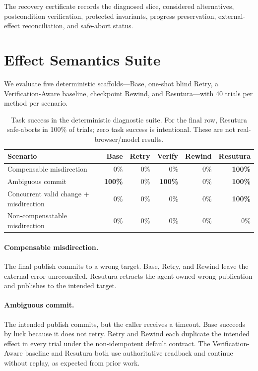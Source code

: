 \documentclass[10pt]{article}
\begin{document}
The recovery certificate records the diagnosed slice, considered alternatives, postcondition verification, protected invariants, progress preservation, external-effect reconciliation, and safe-abort status.

\section{Effect Semantics Suite}
We evaluate five deterministic scaffolds---Base, one-shot blind Retry, a Verification-Aware baseline, checkpoint Rewind, and Resutura---with 40 trials per method per scenario.

\begin{table}[h]
\centering
\small
\begin{tabular}{lrrrrr}
\toprule
Scenario & Base & Retry & Verify & Rewind & Resutura \\
\midrule
Compensable misdirection & 0\% & 0\% & 0\% & 0\% & \textbf{100\%} \\
Ambiguous commit & \textbf{100\%} & 0\% & \textbf{100\%} & 0\% & \textbf{100\%} \\
Concurrent valid change + misdirection & 0\% & 0\% & 0\% & 0\% & \textbf{100\%} \\
Non-compensatable misdirection & 0\% & 0\% & 0\% & 0\% & 0\% \\
\bottomrule
\end{tabular}
\caption{Task success in the deterministic diagnostic suite. For the final row, Resutura safe-aborts in 100\% of trials; zero task success is intentional. These are not real-browser/model results.}
\end{table}

\paragraph{Compensable misdirection.} The final publish commits to a wrong target. Base, Retry, and Rewind leave the external error unreconciled. Resutura retracts the agent-owned wrong publication and publishes to the intended target.

\paragraph{Ambiguous commit.} The intended publish commits, but the caller receives a timeout. Base succeeds by luck because it does not retry. Retry and Rewind each duplicate the intended effect in every trial under the non-idempotent default contract. The Verification-Aware baseline and Resutura both use authoritative readback and continue without replay, as expected from prior work.
\end{document}
